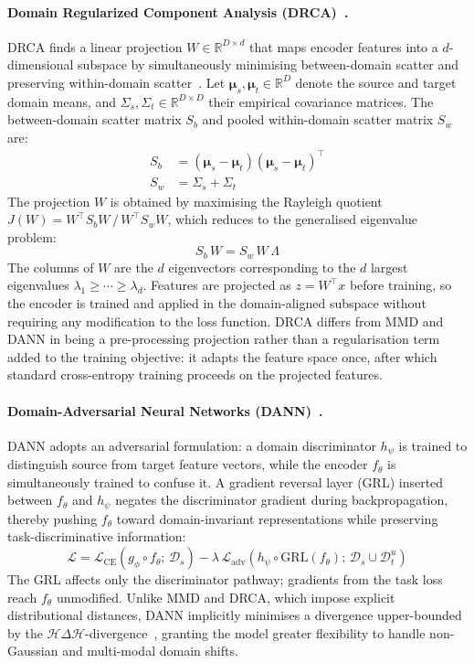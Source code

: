 \documentclass[english,bibtex]{kththesis}
\begin{document}
\paragraph{Domain Regularized Component Analysis (DRCA)~\cite{zhan2024drca}.}
DRCA finds a linear projection $W \in \mathbb{R}^{D \times d}$ that maps encoder features into a $d$-dimensional subspace by simultaneously minimising between-domain scatter and preserving within-domain scatter~\cite{zhan2024drca}. Let $\boldsymbol{\mu}_s, \boldsymbol{\mu}_t \in \mathbb{R}^D$ denote the source and target domain means, and $\Sigma_s, \Sigma_t \in \mathbb{R}^{D \times D}$ their empirical covariance matrices. The between-domain scatter matrix $S_b$ and pooled within-domain scatter matrix $S_w$ are:
\begin{align}
  S_b &= (\boldsymbol{\mu}_s - \boldsymbol{\mu}_t)(\boldsymbol{\mu}_s - \boldsymbol{\mu}_t)^\top \\
  S_w &= \Sigma_s + \Sigma_t
\end{align}
The projection $W$ is obtained by maximising the Rayleigh quotient $J(W) = W^\top S_b W \,/\, W^\top S_w W$, which reduces to the generalised eigenvalue problem:
\begin{equation}
  S_b\,W = S_w\,W\,\Lambda
\label{eq:drca}
\end{equation}
The columns of $W$ are the $d$ eigenvectors corresponding to the $d$ largest eigenvalues $\lambda_1 \geq \cdots \geq \lambda_d$. Features are projected as $z = W^\top x$ before training, so the encoder is trained and applied in the domain-aligned subspace without requiring any modification to the loss function. DRCA differs from MMD and DANN in being a pre-processing projection rather than a regularisation term added to the training objective: it adapts the feature space once, after which standard cross-entropy training proceeds on the projected features.

\paragraph{Domain-Adversarial Neural Networks (DANN)~\cite{ganin2016domain}.}
DANN adopts an adversarial formulation: a domain discriminator $h_\psi$ is trained to distinguish source from target feature vectors, while the encoder $f_\theta$ is simultaneously trained to confuse it. A gradient reversal layer (GRL) inserted between $f_\theta$ and $h_\psi$ negates the discriminator gradient during backpropagation, thereby pushing $f_\theta$ toward domain-invariant representations while preserving task-discriminative information:
\begin{equation}
  \mathcal{L} = \mathcal{L}_\text{CE}(g_\phi \circ f_\theta;\,\mathcal{D}_s)
               - \lambda\,\mathcal{L}_\text{adv}\!\left(h_\psi \circ \mathrm{GRL}(f_\theta);\,\mathcal{D}_s \cup \mathcal{D}_t^u\right)
\end{equation}
The GRL affects only the discriminator pathway; gradients from the task loss reach $f_\theta$ unmodified. Unlike MMD and DRCA, which impose explicit distributional distances, DANN implicitly minimises a divergence upper-bounded by the $\mathcal{H}\Delta\mathcal{H}$-divergence~\cite{ben2010theory}, granting the model greater flexibility to handle non-Gaussian and multi-modal domain shifts.
\end{document}
